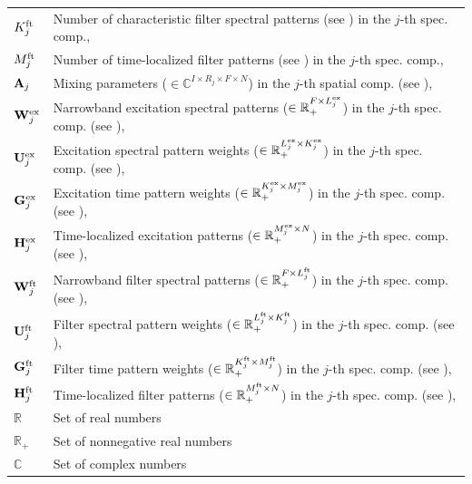 \documentclass{article}
\begin{document}
\begin{tabular}{ll}
$K^{\rm ft}_j$ & Number of characteristic filter spectral patterns (see \cite{Ozerov2010a}) in the $j$-th spec. comp., \\

$M^{\rm ft}_j$ & Number of time-localized filter patterns (see \cite{Ozerov2010a}) in the $j$-th spec. comp., \\

${\bf A}_j$ & Mixing parameters ($\in \mathbb C^{I \times R_j \times F \times N}$) in the $j$-th spatial comp. (see \cite{Ozerov2010a}), \\

${\bf W}^{\rm ex}_j$ & Narrowband excitation spectral patterns ($\in \mathbb R_+^{F \times L^{\rm ex}_j}$) in the $j$-th spec. comp. (see \cite{Ozerov2010a}), \\

${\bf U}^{\rm ex}_j$ & Excitation spectral pattern weights ($\in \mathbb R_+^{L^{\rm ex}_j \times K^{\rm ex}_j}$) in the $j$-th spec. comp. (see \cite{Ozerov2010a}), \\

${\bf G}^{\rm ex}_j$ & Excitation time pattern weights ($\in \mathbb R_+^{K^{\rm ex}_j \times M^{\rm ex}_j}$) in the $j$-th spec. comp. (see \cite{Ozerov2010a}), \\

${\bf H}^{\rm ex}_j$ & Time-localized excitation patterns ($\in \mathbb R_+^{M^{\rm ex}_j \times N}$) in the $j$-th spec. comp. (see \cite{Ozerov2010a}), \\

${\bf W}^{\rm ft}_j$ & Narrowband filter spectral patterns ($\in \mathbb R_+^{F \times L^{\rm ft}_j}$) in the $j$-th spec. comp. (see \cite{Ozerov2010a}), \\

${\bf U}^{\rm ft}_j$ & Filter spectral pattern weights ($\in \mathbb R_+^{L^{\rm ft}_j \times K^{\rm ft}_j}$) in the $j$-th spec. comp. (see \cite{Ozerov2010a}), \\

${\bf G}^{\rm ft}_j$ & Filter time pattern weights ($\in \mathbb R_+^{K^{\rm ft}_j \times M^{\rm ft}_j}$) in the $j$-th spec. comp. (see \cite{Ozerov2010a}), \\

${\bf H}^{\rm ft}_j$ & Time-localized filter patterns ($\in \mathbb R_+^{M^{\rm ft}_j \times N}$) in the $j$-th spec. comp. (see \cite{Ozerov2010a}), \\

$\mathbb R$ & Set of real numbers \\

$\mathbb R_+$ & Set of nonnegative real numbers \\

$\mathbb C$ & Set of complex numbers \\
\end{tabular}
\end{document}
